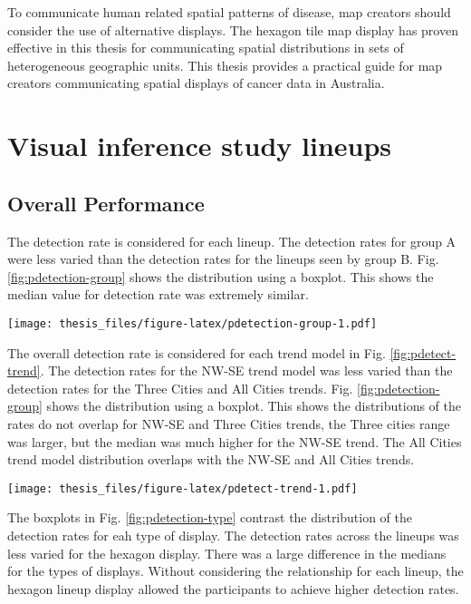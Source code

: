 \documentclass{monashthesis}
\begin{document}
To communicate human related spatial patterns of disease, map creators should consider the use of alternative displays. The hexagon tile map display has proven effective in this thesis for communicating spatial distributions in sets of heterogeneous geographic units. This thesis provides a practical guide for map creators communicating spatial displays of cancer data in Australia.

\appendix

\hypertarget{visual-inference-study-lineups}{%
\chapter{Visual inference study lineups}\label{visual-inference-study-lineups}}

\hypertarget{overall-performance}{%
\section{Overall Performance}\label{overall-performance}}

The detection rate is considered for each lineup. The detection rates for group A were less varied than the detection rates for the lineups seen by group B. Fig. \ref{fig:pdetection-group} shows the distribution using a boxplot. This shows the median value for detection rate was extremely similar.

\texttt{[image: thesis\_files/figure-latex/pdetection-group-1.pdf]}

The overall detection rate is considered for each trend model in Fig. \ref{fig:pdetect-trend}.
The detection rates for the NW-SE trend model was less varied than the detection rates for the Three Cities and All Cities trends. Fig. \ref{fig:pdetection-group} shows the distribution using a boxplot. This shows the distributions of the rates do not overlap for NW-SE and Three Cities trends, the Three cities range was larger, but the median was much higher for the NW-SE trend. The All Cities trend model distribution overlaps with the NW-SE and All Cities trends.

\texttt{[image: thesis\_files/figure-latex/pdetect-trend-1.pdf]}

The boxplots in Fig. \ref{fig:pdetection-type} contrast the distribution of the detection rates for eah type of display.
The detection rates across the lineups was less varied for the hexagon display. There was a large difference in the medians for the types of displays.
Without considering the relationship for each lineup, the hexagon lineup display allowed the participants to achieve higher detection rates.
\end{document}
